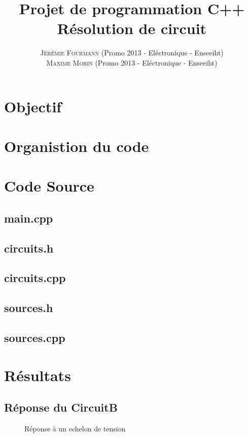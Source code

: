 \documentclass[a4paper,11pt]{article}
\title{\textbf{ \huge{Projet de programmation C++}} \\{\Large  Résolution de circuit}}
\author{
\textsc{Jérémie Fourmann} (Promo 2013 - Eléctronique - Enseeiht)\\ %
\textsc{Maxime Morin} (Promo 2013 - Eléctronique - Enseeiht)\\ %
}
\begin{document}
\pagestyle{plain}

\maketitle
\vspace{1cm}
\renewcommand{\contentsname}{Plan}
\tableofcontents
\vspace{2cm}



\newpage



\section{Objectif}
\section{Organistion du code}

\section{Code Source}
  \subsection{main.cpp}
    
    \newpage
  \subsection{circuits.h}
    
    \newpage
  \subsection{circuits.cpp}
    
    \newpage
   \subsection{sources.h}
    
    \newpage
   \subsection{sources.cpp}
    
    \newpage

\section{Résultats}
  \subsection{Réponse du CircuitB}
 
      \begin{figure}[H]
	 \begin{center}
	\caption{Réponse à un echelon de tension}
	\end{center}
      \end{figure}
    
\end{document}
